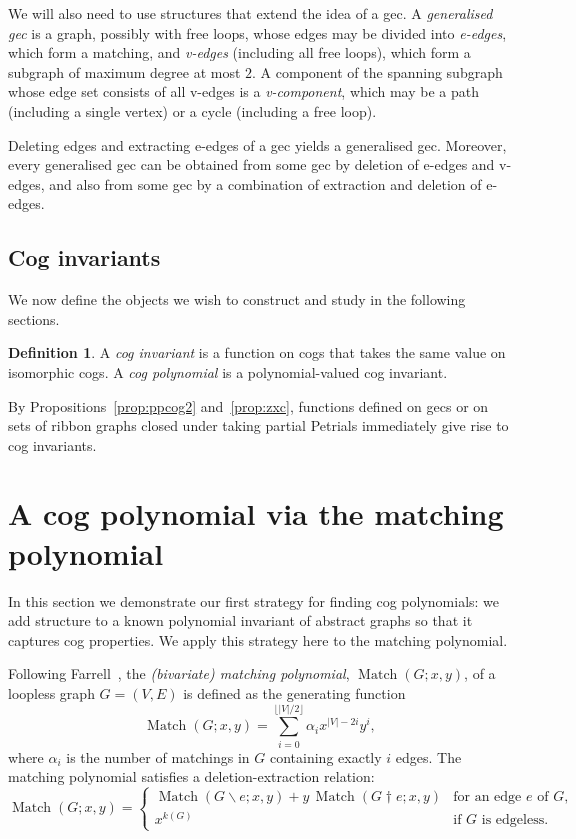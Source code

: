 \documentclass{amsart}
\DeclareMathOperator{\Match}{Match}
\newcommand{\ba}{\mathbin{\backslash}}
\newcommand{\ext}{\mathbin{\dagger}}
\theoremstyle{definition}
\newtheorem{definition}[theorem]{Definition}
\theoremstyle{remark}
\numberwithin{equation}{section}
\begin{document}
We will also need to use structures that extend the idea of a gec.
A \emph{generalised gec} is a graph, possibly with free loops, whose edges may be divided into \emph{e-edges}, which form a matching, and \emph{v-edges} (including all free loops), which form a subgraph of maximum degree at most $2$.
A component of the spanning subgraph whose edge set consists of all v-edges is a \emph{v-component}, which may be a path (including a single vertex) or a cycle (including a free loop).

Deleting edges and extracting e-edges of a gec yields a generalised gec.  Moreover, every generalised gec can be obtained from some gec by deletion of e-edges and v-edges, and also from some gec by a combination of extraction and deletion of e-edges.

\subsection{Cog invariants}\label{ss:coginv}
We now define the objects we wish to construct and study in the following sections.
\begin{definition}\label{def:coginv}
 A \emph{cog invariant} is a function on cogs that takes the same value on isomorphic cogs. A \emph{cog polynomial} is a polynomial-valued cog invariant.
\end{definition}

By Propositions~\ref{prop:ppcog2} and~\ref{prop:zxc}, functions defined on gecs or on sets of ribbon graphs closed under taking partial Petrials immediately give rise to cog invariants.





\def\cmbb{ }

\section{A cog polynomial via the matching polynomial} \label{sec:matching_polynomial}
In this section  we demonstrate our first strategy for finding cog polynomials: we add structure to a known polynomial invariant of abstract graphs so that it captures cog properties. We apply this strategy here to the matching polynomial.

Following Farrell~\cite{zbMATH03523610}, the \emph{(bivariate) matching polynomial}, $\Match(G;x,y)$, of a loopless graph  $G=(V,E)$ is defined as the generating function 
\[ \Match(G;x,y) = \sum_{i=0}^{\lfloor |V|/2 \rfloor} \alpha_ix^{|V|-2i}y^{i}, \]
where $\alpha_i$ is the number of matchings in $G$ containing exactly $i$ edges. The matching polynomial satisfies a deletion-extraction relation:
\begin{equation}\label{ed:mde}
\Match(G;x,y) =  \begin{cases}
\Match(G \ba e;x,y) +y\, \Match(G\ext e;x,y) &\text{for an edge $e$ of $G$,}\\
x^{k(G)} & \text{if $G$ is edgeless.}
\end{cases}
\end{equation}
\end{document}
